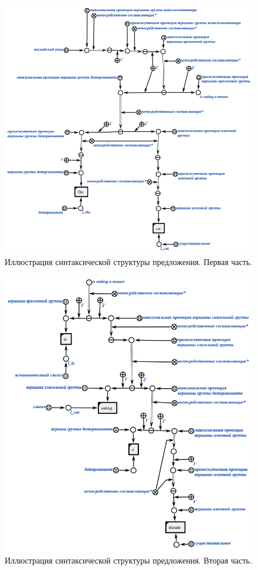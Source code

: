 \begin{figure}[h]
    \centering
    \includegraphics[scale=0.8]{images/part2/chapter_lang/syntactic_structure_part_1}
    \caption{Иллюстрация синтаксической структуры предложения. Первая часть.}
    \label{fig:pic_syntactic_tree_part_1}
\end{figure}

\begin{figure}[h]
    \centering
    \includegraphics[scale=0.8]{images/part2/chapter_lang/syntactic_structure_part_2}
    \caption{Иллюстрация синтаксической структуры предложения. Вторая часть.}
    \label{fig:pic_syntactic_tree_part_2}
\end{figure}

